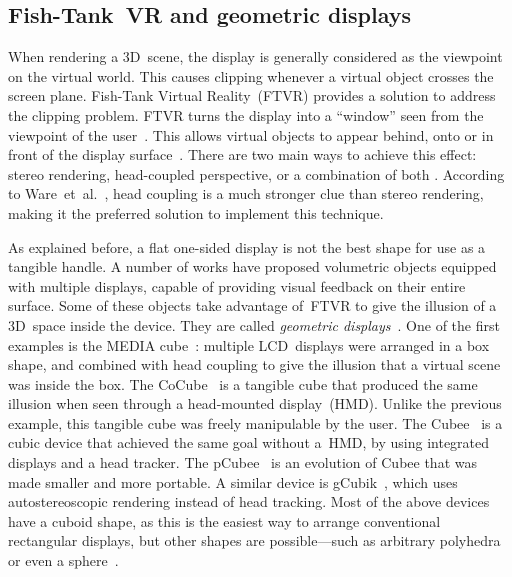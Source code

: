 \documentclass{vgtc}                         \havecopyrightspacefalse
\begin{document}
\subsection{Fish-Tank~VR and geometric displays}

When rendering a 3D~scene, the display is generally considered as the viewpoint on the virtual world. This causes clipping whenever a virtual object crosses the screen plane. Fish-Tank Virtual Reality~(FTVR) provides a solution to address the clipping problem. FTVR turns the display into a ``window'' seen from the viewpoint of the user~\cite{ware93}. This allows virtual objects to appear behind, onto or in front of the display surface~\cite{francone11}. There are two main ways to achieve this effect: stereo rendering, head-coupled perspective, or a combination of both \cite{ware93}. According to Ware~et~al.~\cite{ware93}, head coupling is a much stronger clue than stereo rendering, making it the preferred solution to implement this technique.

As explained before, a flat one-sided display is not the best shape for use as a tangible handle. A number of works have proposed volumetric objects equipped with multiple displays, capable of providing visual feedback on their entire surface. Some of these objects take advantage of~FTVR to give the illusion of a 3D~space inside the device. They are called \textit{geometric displays}~\cite{stavness10}. One of the first examples is the MEDIA cube~\cite{inami97}: multiple LCD~displays were arranged in a box shape, and combined with head coupling to give the illusion that a virtual scene was inside the box. The CoCube~\cite{brown03} is a tangible cube that produced the same illusion when seen through a head-mounted display~(HMD). Unlike the previous example, this tangible cube was freely manipulable by the user. The Cubee~\cite{stavness06} is a cubic device that achieved the same goal without a~HMD, by using integrated displays and a head tracker. The pCubee~\cite{stavness10} is an evolution of Cubee that was made smaller and more portable. A similar device is gCubik~\cite{lopez-gulliver09}, which uses autostereoscopic rendering instead of head tracking. Most of the above devices have a cuboid shape, as this is the easiest way to arrange conventional rectangular displays, but other shapes are possible---such as arbitrary polyhedra~\cite{harish13} or even a sphere~\cite{ferreira14}.
\end{document}

